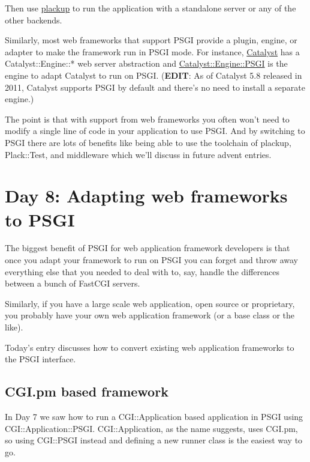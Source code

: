 Then use
\href{http://advent.plackperl.org/2009/12/day-3-using-plackup.html}{plackup}
to run the application with a standalone server or any of the other
backends.

Similarly, most web frameworks that support PSGI provide a plugin,
engine, or adapter to make the framework run in PSGI mode. For instance,
\href{http://www.catalystframework.org/}{Catalyst} has a
Catalyst::Engine::* web server abstraction and
\href{http://search.cpan.org/perldoc?Catalyst::Engine::PSGI}{Catalyst::Engine::PSGI}
is the engine to adapt Catalyst to run on PSGI. (\textbf{EDIT}: As of
Catalyst 5.8 released in 2011, Catalyst supports PSGI by default and
there's no need to install a separate engine.)

The point is that with support from web frameworks you often won't need
to modify a single line of code in your application to use PSGI. And by
switching to PSGI there are lots of benefits like being able to use the
toolchain of plackup, Plack::Test, and middleware which we'll discuss in
future advent entries.

\chapter{Day 8: Adapting web frameworks to
PSGI}\label{day-8-adapting-web-frameworks-to-psgi}

The biggest benefit of PSGI for web application framework developers is
that once you adapt your framework to run on PSGI you can forget and
throw away everything else that you needed to deal with to, say, handle
the differences between a bunch of FastCGI servers.

Similarly, if you have a large scale web application, open source or
proprietary, you probably have your own web application framework (or a
base class or the like).

Today's entry discusses how to convert existing web application
frameworks to the PSGI interface.

\section{CGI.pm based framework}\label{cgi.pm-based-framework}

In Day 7 we saw how to run a CGI::Application based application in PSGI
using CGI::Application::PSGI. CGI::Application, as the name suggests,
uses CGI.pm, so using CGI::PSGI instead and defining a new runner class
is the easiest way to go.

